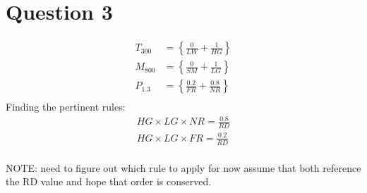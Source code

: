 \documentclass[12pt,a4paper]{article}
\begin{document}
\section*{Question 3}
\label{sec:question_3}
\begin{align*}
	T_{300} &= \left\{\frac{0}{LW} + \frac{1}{HG}\right\} \\
	M_{800} &= \left\{\frac{0}{SM} + \frac{1}{LG}\right\} \\
	P_{1.3} &= \left\{\frac{0.2}{FR} + \frac{0.8}{NR}\right\} \\
\end{align*}
Finding the pertinent rules:
\begin{align*}
	HG\times LG \times NR = \frac{0.8}{RD}\\
	HG\times LG \times FR = \frac{0.2}{RD}\\
\end{align*}

NOTE: need to figure out which rule to apply for now assume that both reference the RD value and hope that order is conserved.
\end{document}

